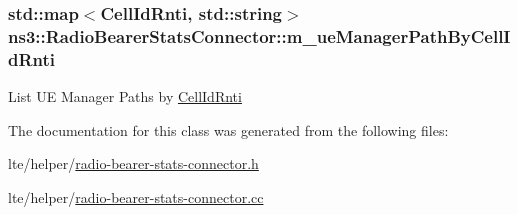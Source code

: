 \subsubsection[{\texorpdfstring{m\+\_\+ue\+Manager\+Path\+By\+Cell\+Id\+Rnti}{m_ueManagerPathByCellIdRnti}}]{\setlength{\rightskip}{0pt plus 5cm}std\+::map$<${\bf Cell\+Id\+Rnti}, std\+::string$>$ ns3\+::\+Radio\+Bearer\+Stats\+Connector\+::m\+\_\+ue\+Manager\+Path\+By\+Cell\+Id\+Rnti\hspace{0.3cm}{\ttfamily [private]}}\hypertarget{classns3_1_1RadioBearerStatsConnector_aae236a1dedc73f04344d6d6bde132331}{}\label{classns3_1_1RadioBearerStatsConnector_aae236a1dedc73f04344d6d6bde132331}
List UE Manager Paths by \hyperlink{structns3_1_1RadioBearerStatsConnector_1_1CellIdRnti}{Cell\+Id\+Rnti} 

The documentation for this class was generated from the following files\+:\begin{DoxyCompactItemize}
\item 
lte/helper/\hyperlink{radio-bearer-stats-connector_8h}{radio-\/bearer-\/stats-\/connector.\+h}\item 
lte/helper/\hyperlink{radio-bearer-stats-connector_8cc}{radio-\/bearer-\/stats-\/connector.\+cc}\end{DoxyCompactItemize}
